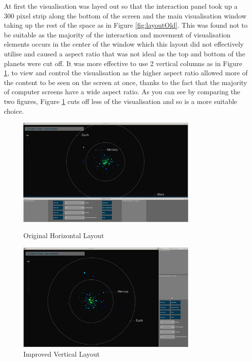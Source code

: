 At first the visualisation was layed out so that the interaction panel took up a
300 pixel strip along the bottom of the screen and the main visualisation window
taking up the rest of the space as in Figure \ref{fig:layoutOld}.
 This was found not to be suitable as the majority of the interaction and
movement of visualisation elements occurs
in the center of the window which this layout did not effectively utilise and
caused a aspect ratio that was not ideal as the top and bottom of the planets
were cut off. It
was more effective to use 2 vertical columns as in Figure \ref{fig:layoutNew},
to view and control the visualisation as
the higher aspect ratio allowed more of the content to be seen on the
screen at once, thanks to the fact that the majority of computer screens have a
wide aspect ratio. As you can see by comparing the two figures, Figure
\ref{fig:layoutNew} cuts off less of the visualisation and so is a more suitable
choice.

\begin{figure}[H]
  \centering
      \includegraphics[width=0.8\textwidth]{images/layout_horizontal.jpg}
  \caption{Original Horizontal Layout}  
    \label{fig:layoutOld}
        \includegraphics[width=0.8\textwidth]{images/layout_vertical.jpg}
  \caption{Improved Vertical Layout}
  \label{fig:layoutNew}
\end{figure}

